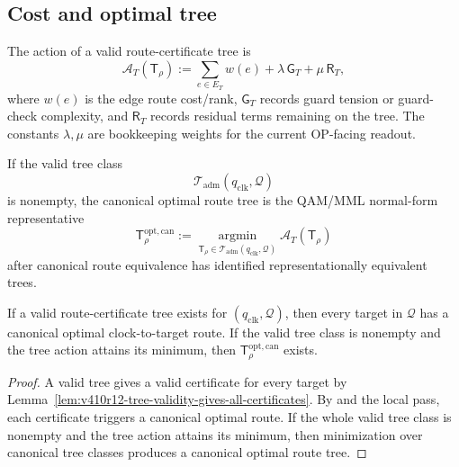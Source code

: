 \subsection{Cost and optimal tree}
\label{subsec:v410r12-cost-and-optimal-tree}

\begin{definition}
\label{def:v410r12-tree-action}
The action of a valid route-certificate tree is
\[
 \mathcal A_T(\mathsf T_{\rho})
 :=
 \sum_{e\in E_T} w(e)
 +
 \lambda\,\mathsf G_T
 +
 \mu\,\mathsf R_T,
\]
where \(w(e)\) is the edge route cost/rank, \(\mathsf G_T\) records guard
tension or guard-check complexity, and \(\mathsf R_T\) records residual terms
remaining on the tree. The constants \(\lambda,\mu\) are bookkeeping weights
for the current OP-facing readout.
\end{definition}

\begin{definition}
\label{def:v410r12-canonical-optimal-route-tree}
If the valid tree class
\[
 \mathcal T_{\mathrm{adm}}(q_{\mathrm{clk}},\mathcal Q)
\]
is nonempty, the canonical optimal route tree is the QAM/MML normal-form
representative
\[
 \mathsf T_{\rho}^{\mathrm{opt,can}}
 :=
 \operatorname*{argmin}_{\mathsf T_{\rho}\in
 \mathcal T_{\mathrm{adm}}(q_{\mathrm{clk}},\mathcal Q)}
 \mathcal A_T(\mathsf T_{\rho})
\]
after canonical route equivalence has identified representationally equivalent
trees.
\end{definition}

\begin{proposition}
\label{prop:v410r12-valid-tree-triggers-all-canonical-routes}
If a valid route-certificate tree exists for \((q_{\mathrm{clk}},\mathcal Q)\),
then every target in \(\mathcal Q\) has a canonical optimal clock-to-target
route. If the valid tree class is nonempty and the tree action attains its
minimum, then \(\mathsf T_{\rho}^{\mathrm{opt,can}}\) exists.
\end{proposition}

\begin{proof}
A valid tree gives a valid certificate for every target by
Lemma~\ref{lem:v410r12-tree-validity-gives-all-certificates}. By and the local pass,
each certificate triggers a canonical optimal route. If the whole valid tree
class is nonempty and the tree action attains its minimum, then minimization
over canonical tree classes produces a canonical optimal route tree.
\end{proof}

